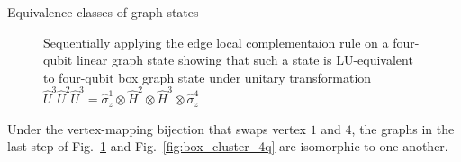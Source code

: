 \documentclass[final]{beamer}
\newlength{\colwidth}
\begin{document}
\begin{frame}[t]
\begin{columns}[t]
\begin{column}{\colwidth}
\begin{block}{Equivalence classes of graph states}
\begin{figure}[H]
\begin{subfigure}[b]{0.25\textwidth}
                        \end{subfigure}
                        \caption{Sequentially applying the edge local complementaion
                            rule on a four-qubit linear graph state showing that such a
                            state is LU-equivalent to four-qubit box graph state under
                            unitary transformation $\hat{U}^{3}\hat{U}^{2}\hat{U}^{3} =
                            \hat{\sigma}^{1}_{z}\otimes\hat{H}^{2}\otimes\hat{H}^{3}\otimes\hat{\sigma}^{4}_z$}
                            \label{fig:edge_local_complementation_example}
                    \end{figure}

                    Under the vertex-mapping bijection that swaps vertex $1$ and $4$, the
                    graphs in the last step of
                    Fig.~\ref{fig:edge_local_complementation_example} and
                    Fig.~\ref{fig:box_cluster_4q} are isomorphic to one another.






\end{block}
\end{column}
\end{columns}
\end{frame}
\end{document}

